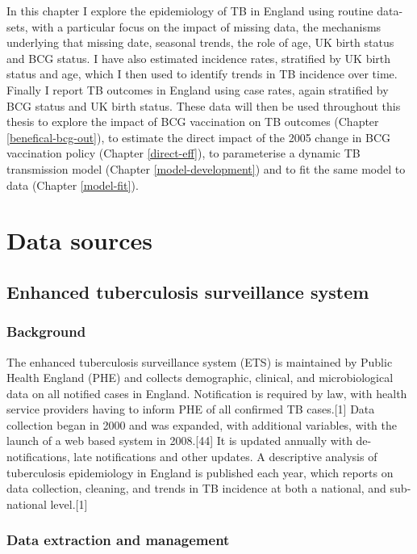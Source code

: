 \documentclass[11pt,twoside]{bristolthesis}
\begin{document}
  In this chapter I explore the epidemiology of TB in England using routine data-sets, with a particular focus on the impact of missing data, the mechanisms underlying that missing date, seasonal trends, the role of age, UK birth status and BCG status. I have also estimated incidence rates, stratified by UK birth status and age, which I then used to identify trends in TB incidence over time. Finally I report TB outcomes in England using case rates, again stratified by BCG status and UK birth status. These data will then be used throughout this thesis to explore the impact of BCG vaccination on TB outcomes (Chapter \ref{benefical-bcg-out}), to estimate the direct impact of the 2005 change in BCG vaccination policy (Chapter \ref{direct-eff}), to parameterise a dynamic TB transmission model (Chapter \ref{model-development}) and to fit the same model to data (Chapter \ref{model-fit}).
  
  \hypertarget{data-sources}{%
  \section{Data sources}\label{data-sources}}
  
  \hypertarget{ets-deep-dive}{%
  \subsection{Enhanced tuberculosis surveillance system}\label{ets-deep-dive}}
  
  \hypertarget{background-1}{%
  \subsubsection{Background}\label{background-1}}
  
  The enhanced tuberculosis surveillance system (ETS) is maintained by Public Health England (PHE) and collects demographic, clinical, and microbiological data on all notified cases in England. Notification is required by law, with health service providers having to inform PHE of all confirmed TB cases.{[}1{]} Data collection began in 2000 and was expanded, with additional variables, with the launch of a web based system in 2008.{[}44{]} It is updated annually with de-notifications, late notifications and other updates. A descriptive analysis of tuberculosis epidemiology in England is published each year, which reports on data collection, cleaning, and trends in TB incidence at both a national, and sub-national level.{[}1{]}
  
  \hypertarget{data-extraction-and-management}{%
  \subsubsection{Data extraction and management}\label{data-extraction-and-management}}
  
\end{document}
